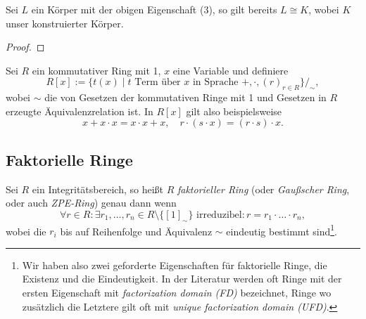 \begin{proposition}
    Sei $L$ ein Körper mit der obigen Eigenschaft (3), so gilt bereits $L \cong K$, wobei $K$ unser konstruierter Körper.
\end{proposition}

\begin{proof}
    
\end{proof}

\begin{example}
    Sei $R$ ein kommutativer Ring mit 1, $x$ eine Variable und definiere
    $$ R[x] := \{ t(x) \mid t \text{ Term über $x$ in Sprache } +, \cdot, (r)_{r \in R} \}/_\sim, $$
    wobei $\sim$ die von Gesetzen der kommutativen Ringe mit 1 und Gesetzen in $R$ erzeugte Äquivalenzrelation ist. In $R[x]$ gilt also beispielsweise
    $$ x + x \cdot x = x \cdot x + x, \quad r \cdot (s \cdot x) = (r \cdot s) \cdot x. $$
\end{example}


\subsection{Faktorielle Ringe}

\begin{definition}
    Sei $R$ ein Integritätsbereich, so heißt $R$ \emph{faktorieller Ring} (oder \emph{Gaußscher Ring}, oder auch \emph{ZPE-Ring}) genau dann wenn
    $$ \forall r \in R : \exists r_1, \hdots, r_n \in R \setminus \{ [1]_\sim \} \text{ irreduzibel} : r = r_1 \cdot \hdots \cdot r_n, $$
    wobei die $r_i$ bis auf Reihenfolge und Äquivalenz $\sim$ eindeutig bestimmt sind\footnote{Wir haben also zwei geforderte Eigenschaften für faktorielle Ringe, die Existenz und die Eindeutigkeit. In der Literatur werden oft Ringe mit der ersten Eigenschaft mit \emph{factorization domain (FD)} bezeichnet, Ringe wo zusätzlich die Letztere gilt oft mit \emph{unique factorization domain (UFD)}.}.
\end{definition}

